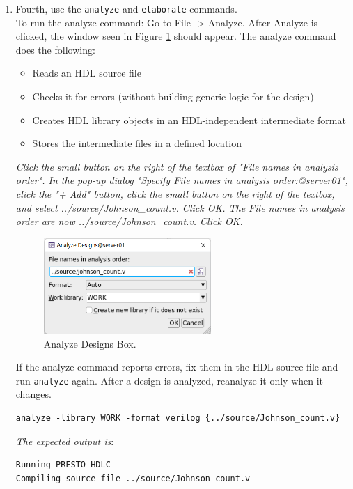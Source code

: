 \documentclass[a4paper,12pt,twoside]{article}
\begin{document}
\begin{enumerate}
\begin{verbatim}
    \end{verbatim}
    \item Fourth, use the \texttt{analyze} and \texttt{elaborate} commands.\\
    To run the analyze command: Go to File -> Analyze. After Analyze is clicked, the window seen in Figure \ref{f20} should appear. The analyze command does the following:
    \begin{itemize}
        \item Reads an HDL source file
        \item Checks it for errors (without building generic logic for the design)
        \item Creates HDL library objects in an HDL-independent intermediate format
        \item Stores the intermediate files in a defined location
    \end{itemize}
    \textit{Click the small button on the right of the textbox of "File names in analysis order". In the pop-up dialog "Specify File names in analysis order:@server01", click the "+ Add" button, click the small button on the right of the textbox, and select ../source/Johnson\_count.v. Click OK. The File names in analysis order are now ../source/Johnson\_count.v. Click OK.}
    \begin{figure}[H]
        \centering
        \includegraphics[width=0.6\textwidth]{images/20.png}
        \caption{Analyze Designs Box.}
        \label{f20}
    \end{figure}
    If the analyze command reports errors, fix them in the HDL source file and run \texttt{analyze} again. After a design is analyzed, reanalyze it only when it changes.
    \begin{verbatim}
analyze -library WORK -format verilog {../source/Johnson_count.v}
    \end{verbatim}
    \textit{The expected output is}:
    \begin{verbatim}
Running PRESTO HDLC
Compiling source file ../source/Johnson_count.v

\end{verbatim}
\end{enumerate}
\end{document}
